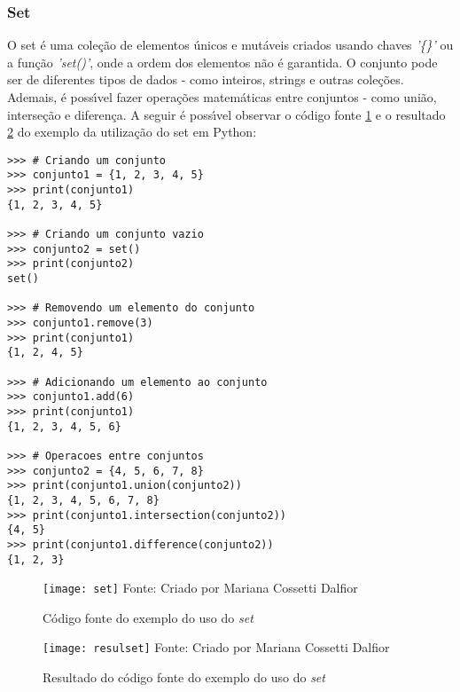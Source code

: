 \subsubsection{Set}
O set \'{e} uma cole\c{c}\~{a}o de elementos \'{u}nicos e mut\'{a}veis criados usando chaves \textsl{'\{\}'} ou a fun\c{c}\~{a}o \textsl{'set()'}, onde a ordem dos elementos n\~{a}o \'{e} garantida. O conjunto pode ser de diferentes tipos de dados - como inteiros, strings e outras cole\c{c}\~{o}es. Ademais, \'{e} poss\'{\i}vel fazer opera\c{c}\~{o}es matem\'{a}ticas entre conjuntos - como uni\~{a}o, interse\c{c}\~{a}o e diferen\c{c}a. A seguir \'{e} poss\'{\i}vel observar o c\'{o}digo fonte \ref{fonteset} e o resultado \ref{resulset} do exemplo da utiliza\c{c}\~{a}o do set em Python:
\begin{lstlisting}
>>> # Criando um conjunto
>>> conjunto1 = {1, 2, 3, 4, 5}
>>> print(conjunto1)  
{1, 2, 3, 4, 5}

>>> # Criando um conjunto vazio
>>> conjunto2 = set()
>>> print(conjunto2)  
set()

>>> # Removendo um elemento do conjunto
>>> conjunto1.remove(3)
>>> print(conjunto1) 
{1, 2, 4, 5}

>>> # Adicionando um elemento ao conjunto
>>> conjunto1.add(6)
>>> print(conjunto1) 
{1, 2, 3, 4, 5, 6}

>>> # Operacoes entre conjuntos
>>> conjunto2 = {4, 5, 6, 7, 8}
>>> print(conjunto1.union(conjunto2)) 
{1, 2, 3, 4, 5, 6, 7, 8}
>>> print(conjunto1.intersection(conjunto2)) 
{4, 5}
>>> print(conjunto1.difference(conjunto2)) 
{1, 2, 3}
\end{lstlisting}	

\begin{figure}[H]
	\begin{center}
		\caption{C\'{o}digo fonte do exemplo do uso do \textsl{set}} \label{fonteset}
		\texttt{[image: set]} 
		\newline
		Fonte: Criado por Mariana Cossetti Dalfior
	\end{center}
\end{figure}

\begin{figure}[H]
	\begin{center}
		\caption{Resultado do c\'{o}digo fonte do exemplo do uso do \textsl{set}} \label{resulset}
		\texttt{[image: resulset]} 
		\newline
		Fonte: Criado por Mariana Cossetti Dalfior
	\end{center}
\end{figure}

